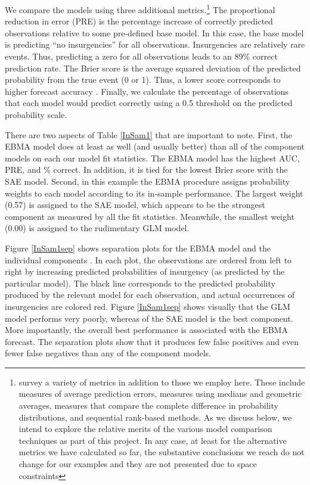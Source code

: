 \documentclass[pdftex,12pt,fullpage,oneside]{amsart}
\begin{document}
We compare the models using three additional
metrics.\footnote{\citet{brandt:freeman:schrodt:2011} survey a variety
  of metrics in addition to those we employ here. These include
  measures of average prediction errors, measures using medians and
  geometric averages, measures that compare the complete difference in
  probability distributions, and sequential rank-based methods.  As we
  discuss below, we intend to explore the relative merits of the
  various model comparison techniques as part of this project.  In any
  case, at least for the alternative metrics we have calculated so
  far, the substantive conclusions we reach do not change for our
  examples and they are not presented due to space constraints} The
proportional reduction in error (PRE) is the percentage increase of
correctly predicted observations relative to some pre-defined base
model. In this case, the base model is predicting ``no insurgencies''
for all observations.  Insurgencies are relatively rare events.  Thus,
predicting a zero for all observations leads to an 89\% correct
prediction rate. The Brier score is the average squared deviation of
the predicted probability from the true event (0 or 1).  Thus, a lower
score corresponds to higher forecast accuracy \citep{Brier:1950}.
Finally, we calculate the percentage of observations that each model
would predict correctly using a 0.5 threshold on the predicted
probability scale.




There are two aspects of Table \ref{InSam1} that are important to
note.  First, the EBMA model does at least as well (and usually
better) than all of the component models on each our model fit
statistics.  The EBMA model has the highest AUC, PRE, and \% correct.
In addition, it is tied for the lowest Brier score with the SAE model.
Second, in this example the EBMA procedure assigns probability weights
to each model according to its in-sample performance.  The largest
weight (0.57) is assigned to the SAE model, which appears to be
the strongest component as measured by all the
fit statistics. Meanwhile, the smallest weight (0.00) is assigned to
the rudimentary GLM model.






Figure \ref{InSam1sep} shows separation plots for the EBMA model and
the individual components \citep{Greenhill:2011}. In each plot, the
observations are ordered from left to right by increasing predicted
probabilities of insurgency (as predicted by the particular
model). The black line corresponds to the predicted probability
produced by the relevant model for each observation, and actual
occurrences of insurgencies are colored red.  Figure \ref{InSam1sep}
shows visually that the GLM model performs very poorly, whereas of the
SAE model is the best component.  More importantly, the overall best
performance is associated with the EBMA forecast. The separation plots
show that it produces few false positives and even fewer
false negatives than any of the component models.
\end{document}
